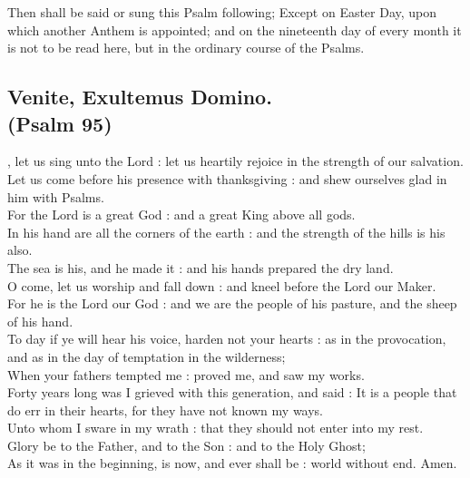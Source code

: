 

\begin{rubric}
Then shall be said or sung this Psalm following;
Except on Easter Day, upon which another Anthem is appointed;
and on the nineteenth day of every month it is not to be read here, but in the ordinary course of the Psalms.
\end{rubric}

\subsection{Venite, Exultemus Domino.\\
(Psalm 95)}

, let us sing unto the Lord : let us heartily rejoice in the strength of our salvation.\\
Let us come before his presence with thanksgiving : and shew ourselves glad in him with Psalms.\\
For the Lord is a great God : and a great King above all gods.\\
In his hand are all the corners of the earth : and the strength of the hills is his also.\\
The sea is his, and he made it : and his hands prepared the dry land.\\
O come, let us worship and fall down : and kneel before the Lord our Maker.\\
For he is the Lord our God : and we are the people of his pasture, and the sheep of his hand.\\
To day if ye will hear his voice, harden not your hearts : as in the provocation, and as in the day of temptation in the wilderness;\\
When your fathers tempted me : proved me, and saw my works.\\
Forty years long was I grieved with this generation, and said : It is a people that do err in their hearts, for they have not known my ways.\\
Unto whom I sware in my wrath : that they should not enter into my rest.\\
Glory be to the Father, and to the Son : and to the Holy Ghost;\\
As it was in the beginning, is now, and ever shall be : world without end. Amen.


